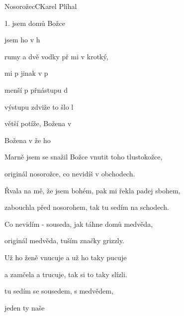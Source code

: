\setcounter{page}{57}
\begin{song}{Nosorožec}{C}{Karel Plíhal}

\begin{SBVerse}

1.  jsem domů Božce  

      jsem ho v h

    rumy a dvě vodky př mi v krotký,

    mi p  jinak v p

    menší p přnástupu d

   výstupu zdviže  to šlo l

    větší potíže,  Božena v 

    Božena v   že ho 

   \end{SBVerse}

\begin{SBVerse}

Marně jsem se snažil Božce vnutit toho tlustokožce,

   originál nosorožce, co nevidíš v obchodech.

   Řvala na mě, že jsem bohém, pak mi řekla padej sbohem,

   zabouchla před nosorohem, tak tu sedím na schodech.

   Co nevidím - souseda, jak táhne domů medvěda,

   originál medvěda, tuším značky grizzly.

   Už ho ženě vnucuje a už ho taky pucuje

   a zamčela a trucuje, tak si to taky slízli.

\end{SBVerse}

\begin{SBVerse}

tu sedím se sousedem, s  medvědem,

     jeden ty naše 

   \end{SBVerse}

   \end{song}

\pagebreak
